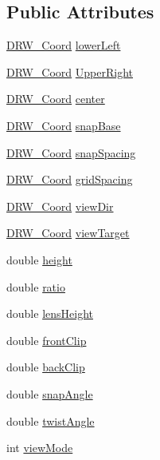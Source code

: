 \subsection*{Public Attributes}
\begin{DoxyCompactItemize}
\item 
\hyperlink{classDRW__Coord}{D\-R\-W\-\_\-\-Coord} \hyperlink{classDRW__Vport_a27df49d3aacabe83be11ac29463f75c1}{lower\-Left}
\item 
\hyperlink{classDRW__Coord}{D\-R\-W\-\_\-\-Coord} \hyperlink{classDRW__Vport_ae63541133c20a69a6e13f25191e02b05}{Upper\-Right}
\item 
\hyperlink{classDRW__Coord}{D\-R\-W\-\_\-\-Coord} \hyperlink{classDRW__Vport_a56104afc60b9fb0b8c6682982f92a45e}{center}
\item 
\hyperlink{classDRW__Coord}{D\-R\-W\-\_\-\-Coord} \hyperlink{classDRW__Vport_a152be2cc28b499c29e9302efa54e001c}{snap\-Base}
\item 
\hyperlink{classDRW__Coord}{D\-R\-W\-\_\-\-Coord} \hyperlink{classDRW__Vport_a19aa53d1282cb737b21fa3d3b60d3b20}{snap\-Spacing}
\item 
\hyperlink{classDRW__Coord}{D\-R\-W\-\_\-\-Coord} \hyperlink{classDRW__Vport_a0284747ef8bda7287e99534d9fdc75e5}{grid\-Spacing}
\item 
\hyperlink{classDRW__Coord}{D\-R\-W\-\_\-\-Coord} \hyperlink{classDRW__Vport_a657f3b92d041527a5a485dce22c448a1}{view\-Dir}
\item 
\hyperlink{classDRW__Coord}{D\-R\-W\-\_\-\-Coord} \hyperlink{classDRW__Vport_a93eb77539e5ad11990b828074685d85f}{view\-Target}
\item 
double \hyperlink{classDRW__Vport_aae2ac1375b707a159d317051a9ff4e9e}{height}
\item 
double \hyperlink{classDRW__Vport_ab84331826a4e1bd181eb2ca6a55e4a97}{ratio}
\item 
double \hyperlink{classDRW__Vport_a9d3e2b640f9f9791d50b00f5cae452f9}{lens\-Height}
\item 
double \hyperlink{classDRW__Vport_a2ee10a71212915501bfdbaa532ec7107}{front\-Clip}
\item 
double \hyperlink{classDRW__Vport_a160e2ab229be33a622e4f888eb4295c7}{back\-Clip}
\item 
double \hyperlink{classDRW__Vport_a1709ba5680cf5b0bf9c7b41bab479225}{snap\-Angle}
\item 
double \hyperlink{classDRW__Vport_a2705ee0b61e21b33cad269b71c04b86c}{twist\-Angle}
\item 
int \hyperlink{classDRW__Vport_ab96feaf67d7eed371e30ffdf04a4a9cb}{view\-Mode}

\end{DoxyCompactItemize}
